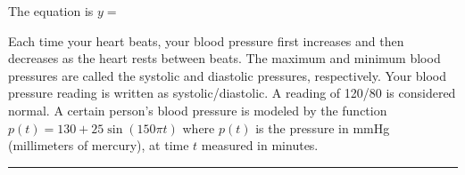 \documentclass[11pt,answers]{exam}
\begin{document}
\begin{questions}
\begin{parts}
 	
 	\fillwithdottedlines{0.8in}
 	\medskip
 	
 	The equation is $y=$\dotfill
 	
 \end{parts}
 
 \question  Each time your heart beats, your blood pressure first increases and then decreases as the heart rests between beats. The maximum and minimum blood pressures are called the systolic and diastolic pressures, respectively. Your blood pressure reading is written as systolic/diastolic. A reading of 120/80 is considered normal. A certain person's blood pressure is modeled by the function
$\displaystyle p(t) = 130 + 25 \sin(150\pi t)$
where $p(t)$ is the pressure in mmHg (millimeters of mercury), at time $t$ measured in minutes.
\end{questions}
\newpage

\par\medskip\hrule\medskip
\end{document}
